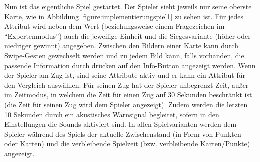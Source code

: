 Nun ist das eigentliche Spiel gestartet. Der Spieler sieht jeweils nur seine oberste Karte, wie in Abbildung \ref{figure:implementierungspiel1} zu sehen ist. Für jedes Attribut wird neben dem Wert (beziehungsweise einem Fragezeichen im ``Expertenmodus'') auch die jeweilige Einheit und die Siegesvariante (höher oder niedriger gewinnt) angegeben. Zwischen den Bildern einer Karte kann durch Swipe-Gesten gewechselt werden und zu jedem Bild kann, falls vorhanden, die passende Information durch drücken auf den Info-Button angezeigt werden. Wenn der Spieler am Zug ist, sind seine Attribute aktiv und er kann ein Attribut für den Vergleich auswählen. Für seinen Zug hat der Spieler unbegrenzt Zeit, außer im Zeitmodus, in welchem die Zeit für einen Zug auf 30 Sekunden beschränkt ist (die Zeit für seinen Zug wird dem Spieler angezeigt). Zudem werden die letzten 10 Sekunden durch ein akustisches Warnsignal begleitet, sofern in den Einstellungen die Sounds aktiviert sind. In allen Spielvarianten werden dem Spieler während des Spiels der aktuelle Zwischenstand (in Form von Punkten oder Karten) und die verbleibende Spielzeit (bzw. verbleibende Karten/Punkte) angezeigt.\\

